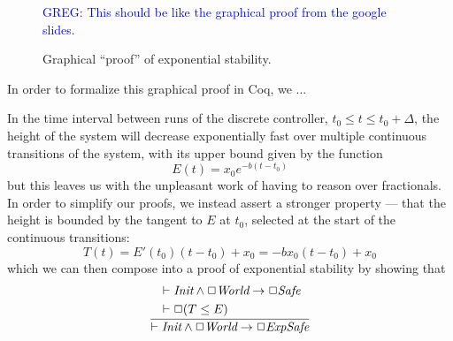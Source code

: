 \documentclass[preprint,nocopyrightspace]{sigplanconf}
\newcommand{\greg}[1]{\textcolor{blue}{\textsc{GREG}: #1}}
\begin{document}
\begin{figure}

\greg{This should be like the graphical proof from the google slides.}

\caption{Graphical ``proof'' of exponential stability.}
\label{fig:graphical-proof}
\end{figure}












In order to formalize this graphical proof in Coq, we ...

In the time interval between runs of the discrete controller, $t_0\leq t \leq t_0+\Delta$, the height of the system will decrease exponentially fast over multiple continuous transitions of the system, with its upper bound given by the function
 \[E(t)=x_0e^{-b(t-t_0)}\]
but this leaves us with the unpleasant work of having to reason over fractionals. In order to simplify our proofs, we instead assert a stronger property --- that the height is bounded by the tangent to $E$ at $t_0$, selected at the start of the continuous transitions:
\[T(t) = E'(t_0)(t-t_0)+x_0 = -bx_0(t-t_0)+x_0\]
which we can then compose into a proof of exponential stability by showing that
\[
  \frac
  {\begin{aligned}
      & \vdash \emph{Init} \land \Box \emph{World} \rightarrow \Box \emph{Safe} \\
      & \vdash \Box (T\leq E)
    \end{aligned}}
  {\vdash \emph{Init} \land \Box \emph{World} \rightarrow \Box \emph{ExpSafe}}
\]
\end{document}
